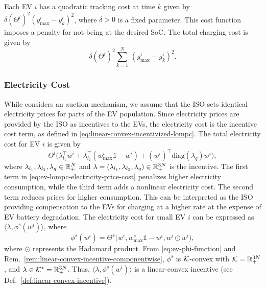 Each EV $i$ has a quadratic tracking cost at time $k$ given by $\delta (\Theta^i)^2(y^i_\text{max} - y^i_k)^2$, where $\delta > 0$ is a fixed parameter.
This cost function imposes a penalty for not being at the desired SoC.
The total charging cost is given by
\begin{equation}
\label{eq:ev-lompc-tracking-cost}
    \delta (\Theta^i)^2 \textstyle{\sum}_{k=1}^N \, (y^i_\text{max} - y^i_k)^2.
\end{equation}

\subsubsection{Electricity Cost}

While \cite{zou2017efficient} considers an auction mechanism, we assume that the ISO sets identical electricity prices for parts of the EV population.
Since electricity prices are provided by the ISO as incentives to the EVs, the electricity cost is the incentive cost term, as defined in \eqref{eq:linear-convex-incentivized-lompc}.
The total electricity cost for EV $i$ is given by
\begin{equation}
\label{eq:ev-lompc-electricity-price-cost}
    \Theta^i \bigl(\lambda_{l_1}^\top w^i + \lambda_{l_2}^\top (w^i_\text{max} \mathbb{1} - w^i) + (w^i)^\top \text{diag}(\lambda_q) w^i \bigr),
\end{equation}
where $\lambda_{l_1}, \lambda_{l_2}, \lambda_q \in \mathbb{R}^N_+$
and $\lambda = (\lambda_{l_1}, \lambda_{l_2}, \lambda_q) \in \mathbb{R}^{3N}_+$ is the incentive.
The first term in \eqref{eq:ev-lompc-electricity-price-cost} penalizes higher electricity consumption, while the third term adds a nonlinear electricity cost.
The second term reduces prices for higher consumption.
This can be interpreted as the ISO providing compensation to the EVs for charging at a higher rate at the expense of EV battery degradation.
The electricity cost for small EV $i$ can be expressed as $\langle \lambda, \phi^s(w^i)\rangle$, where %
\begin{equation}
\label{eq:ev-phi-function}
    \phi^s(w^i) = \Theta^s \bigl(w^i, w^s_\text{max} \mathbb{1} - w^i, w^i \odot w^i\bigr),
\end{equation}
where $\odot$ represents the Hadamard product.
From \eqref{eq:ev-phi-function} and Rem.~\ref{rem:linear-convex-incentive-componentwise}, $\phi^s$ is $\mathcal{K}$-convex with $\mathcal{K} = \mathbb{R}^{3N}_+$, and $\lambda \in \mathcal{K}^* = \mathbb{R}^{3N}_+$.
Thus, $\langle \lambda, \phi^s(w^i)\rangle$ is a linear-convex incentive (see Def.~\ref{def:linear-convex-incentive}).

